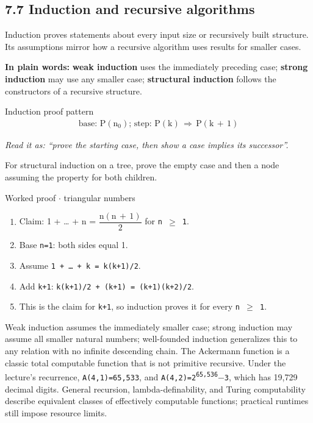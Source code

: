 \documentclass[11pt]{article}
\begin{document}
\begin{keepsection}
\section{7.7 Induction and recursive algorithms}

Induction proves statements about every input size or recursively built structure. Its assumptions mirror how a recursive algorithm uses results for smaller cases.

\begin{plainbox}\textbf{In plain words:} \textbf{weak induction} uses the immediately preceding case; \textbf{strong induction} may use any smaller case; \textbf{structural induction} follows the constructors of a recursive structure.\end{plainbox}

\begin{equationcard}{Induction proof pattern}
\[ \begin{gathered} \text{base}:\, \mathrm{P}(\mathrm{n}_{0});\, \text{step}:\, \mathrm{P}(\mathrm{k})\, \Rightarrow \, \mathrm{P}(\mathrm{k}\, +\, 1) \end{gathered} \]
{\small \emph{Read it as: “prove the starting case, then show a case implies its successor”.}\par For structural induction on a tree, prove the empty case and then a node assuming the property for both children.}
\end{equationcard}

\begin{workedbox}{Worked proof \ensuremath{\cdot} triangular numbers}
\begin{enumerate}
\item Claim: 1 + … + n = {\small\ensuremath{\dfrac{\mathrm{n}(\mathrm{n}\, +\, 1)}{2}}} for \texttt{n \ensuremath{\geq} 1}.
\item Base \texttt{n=1}: both sides equal 1.
\item Assume \texttt{1 + … + k = k(k+1)/2}.
\item Add \texttt{k+1}: \texttt{k(k+1)/2 + (k+1) = (k+1)(k+2)/2}.
\item This is the claim for \texttt{k+1}, so induction proves it for every \texttt{n \ensuremath{\geq} 1}.
\end{enumerate}
\end{workedbox}

Weak induction assumes the immediately smaller case; strong induction may assume all smaller natural numbers; well-founded induction generalizes this to any relation with no infinite descending chain. The Ackermann function is a classic total computable function that is not primitive recursive. Under the lecture’s recurrence, \texttt{A(4,1)=65,533}, and \texttt{A(4,2)=2\textsuperscript{65,536}\ensuremath{-}3}, which has 19,729 decimal digits. General recursion, lambda-definability, and Turing computability describe equivalent classes of effectively computable functions; practical runtimes still impose resource limits.


\end{keepsection}
\end{document}
